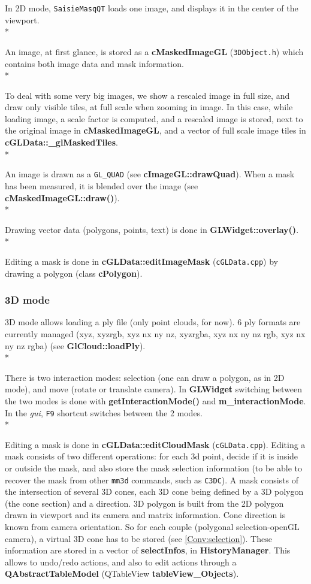 In 2D mode, {\tt SaisieMasqQT} loads one image, and displays it in the center of the viewport.\\*

An image, at first glance, is stored as a \textbf{cMaskedImageGL} ({\tt 3DObject.h}) which contains both image data and mask information.\\*

To deal with some very big images, we show a rescaled image in full size, and draw only visible tiles, at full scale when zooming in image. In this case, while loading image, a scale factor is computed, and a rescaled image is stored, next to the original image in \textbf{cMaskedImageGL}, and a vector of full scale image tiles in \textbf{cGLData::\_glMaskedTiles}.\\*

An image is drawn as a {\tt GL\_QUAD} (see \textbf{cImageGL::drawQuad}). When a mask has been measured, it is blended over the image (see \textbf{cMaskedImageGL::draw()}).\\*

Drawing vector data (polygons, points, text) is done in \textbf{GLWidget::overlay()}.\\*

Editing a mask is done in \textbf{cGLData::editImageMask} ({\tt cGLData.cpp}) by drawing a polygon (class \textbf{cPolygon}). 

\subsubsection{3D mode}

3D mode allows loading a ply file (only point clouds, for now). 6 ply formats are currently managed (xyz, xyzrgb, xyz nx ny nz, xyzrgba, xyz nx ny nz rgb, xyz nx ny nz rgba) (see \textbf{GlCloud::loadPly}).\\*

There is two interaction modes: selection (one can draw a polygon, as in 2D mode), and move (rotate or translate camera). In \textbf{GLWidget} switching between the two modes is done with \textbf{getInteractionMode()} and \textbf{m\_interactionMode}. In the \textit{gui}, {\tt F9} shortcut switches between the 2 modes.\\*

Editing a mask is done in \textbf{cGLData::editCloudMask} ({\tt cGLData.cpp}). Editing a mask consists of two different operations: for each 3d point, decide if it is inside or outside the mask, and also store the mask selection information (to be able to recover the mask from other {\tt mm3d} commands, such as {\tt C3DC}). A mask consists of the intersection of several 3D cones, each 3D cone being defined by a 3D polygon (the cone section) and a direction. 3D polygon is built from the 2D polygon drawn in viewport and its camera and matrix information. Cone direction is known from camera orientation. So for each couple (polygonal selection-openGL camera), a virtual 3D cone has to be stored (see \ref{Conv:selection}). These information are stored in a vector of \textbf{selectInfos}, in \textbf{HistoryManager}. This allows to undo/redo actions, and also to edit actions through a \textbf{QAbstractTableModel} (QTableView \textbf{tableView\_Objects}).



